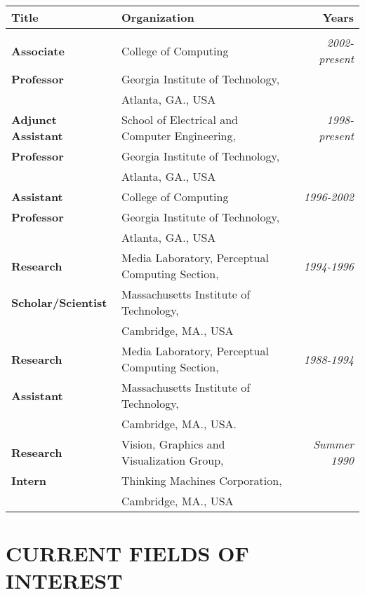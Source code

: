 \begin{center}
\begin{tabular}{llr}
\textbf{Title} & \textbf{Organization} & \textbf{Years} \\ \hline \\[.1in]

\textbf{Associate} & College of Computing & {\sl 2002-present}
\\
\textbf{Professor} & Georgia Institute of Technology, \\
& Atlanta, GA., USA\\[\tabitemskip]

\textbf{Adjunct Assistant} & School of Electrical and Computer
Engineering, & {\sl 1998-present} \\
\textbf{Professor} & Georgia Institute of Technology, \\
& Atlanta, GA., USA \\[\tabitemskip]

\textbf{Assistant} & College of Computing & {\sl 1996-2002}
\\
\textbf{Professor} & Georgia Institute of Technology, \\
& Atlanta, GA., USA\\[\tabitemskip]


\textbf{Research} & Media Laboratory, Perceptual Computing
Section, & {\sl 1994-1996} \\
\textbf{Scholar/Scientist} & Massachusetts Institute of
Technology, \\
& Cambridge, MA., USA \\[\tabitemskip]

\textbf{Research} & Media Laboratory, Perceptual Computing
Section, & {\sl 1988-1994} \\
\textbf{Assistant} & Massachusetts Institute of Technology,\\
& Cambridge, MA., USA. \\[\tabitemskip]

\textbf{Research} & Vision, Graphics and Visualization Group,&
{\sl Summer 1990} \\
\textbf{Intern} & Thinking Machines Corporation, \\ & Cambridge,
MA., USA

\end{tabular}
\end{center}


\section*{CURRENT FIELDS OF INTEREST}
\label{sec:current}

